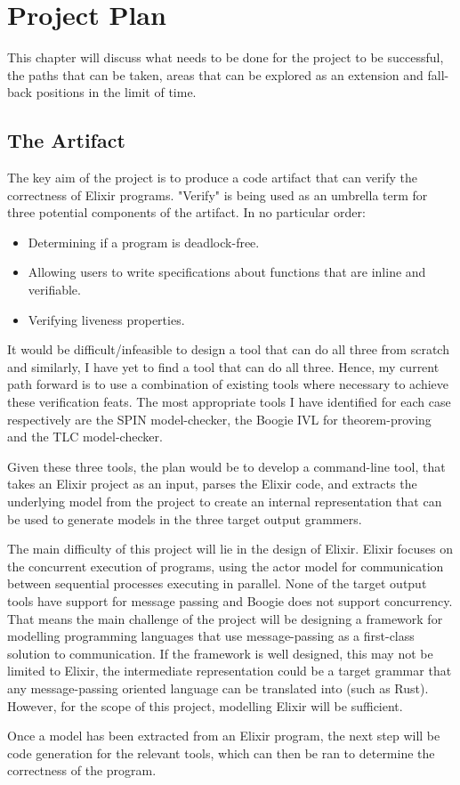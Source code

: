 \chapter{Project Plan}
This chapter will discuss what needs to be done for the project to be successful, the paths that can be taken, areas that can be explored as an extension and fall-back positions in the limit of time.
\par
\section[]{The Artifact}
The key aim of the project is to produce a code artifact that can verify the correctness of Elixir programs. "Verify" is being used as an umbrella term for three potential components of the artifact. In no particular order:
\begin{itemize}
    \item Determining if a program is deadlock-free.
    \item Allowing users to write specifications about functions that are inline and verifiable.
    \item Verifying liveness properties. 
\end{itemize}
It would be difficult/infeasible to design a tool that can do all three from scratch and similarly, I have yet to find a tool that can do all three. Hence, my current path forward is to use a combination of existing tools where necessary to achieve these verification feats. The most appropriate tools I have identified for each case respectively are the SPIN model-checker, the Boogie IVL for theorem-proving and the TLC model-checker.
\par
Given these three tools, the plan would be to develop a command-line tool, that takes an Elixir project as an input, parses the Elixir code, and extracts the underlying model from the project to create an internal representation that can be used to generate models in the three target output grammers.
\par
The main difficulty of this project will lie in the design of Elixir. Elixir focuses on the concurrent execution of programs, using the actor model for communication between sequential processes executing in parallel. None of the target output tools have support for message passing and Boogie does not support concurrency. That means the main challenge of the project will be designing a framework for modelling programming languages that use message-passing as a first-class solution to communication. If the framework is well designed, this may not be limited to Elixir, the intermediate representation could be a target grammar that any message-passing oriented language can be translated into (such as Rust). However, for the scope of this project, modelling Elixir will be sufficient.
\par
Once a model has been extracted from an Elixir program, the next step will be code generation for the relevant tools, which can then be ran to determine the correctness of the program.
